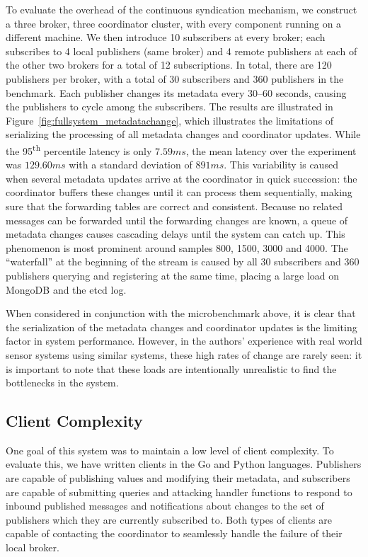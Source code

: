 To evaluate the overhead of the continuous syndication mechanism, we construct a three broker, three coordinator cluster, with every component running on a different machine.
We then introduce 10 subscribers at every broker; each subscribes to 4 local publishers (same broker) and 4 remote publishers at each of the other two brokers for a total of 12 subscriptions.
In total, there are 120 publishers per broker, with a total of 30 subscribers and 360 publishers in the benchmark.
Each publisher changes its metadata every 30--60 seconds, causing the publishers to cycle among the subscribers.
The results are illustrated in Figure~\ref{fig:fullsystem_metadatachange}, which illustrates the limitations of serializing the processing of all metadata changes and coordinator updates.
While the 95\textsuperscript{th} percentile latency is only $7.59ms$, the mean latency over the experiment was $129.60ms$ with a standard deviation of $891ms$.
This variability is caused when several metadata updates arrive at the coordinator in quick succession: the coordinator buffers these changes until it can process them sequentially, making sure that the forwarding tables are correct and consistent.
Because no related messages can be forwarded until the forwarding changes are known, a queue of metadata changes causes cascading delays until the system can catch up.
This phenomenon is most prominent around samples 800, 1500, 3000 and 4000.
The ``waterfall'' at the beginning of the stream is caused by all 30 subscribers and 360 publishers querying and registering at the same time, placing a large load on MongoDB and the etcd log.

When considered in conjunction with the microbenchmark above, it is clear that the serialization of the metadata changes and coordinator updates is the limiting factor in system performance.
However, in the authors' experience with real world sensor systems using similar systems, these high rates of change are rarely seen: it is important to note that these loads are intentionally unrealistic to find the bottlenecks in the system.

\subsection{Client Complexity}

One goal of this system was to maintain a low level of client complexity.
To evaluate this, we have written clients in the Go and Python languages.
Publishers are capable of publishing values and modifying their metadata, and subscribers are capable of submitting queries and attacking handler functions to respond to inbound published messages and notifications about changes to the set of publishers which they are currently subscribed to.
Both types of clients are capable of contacting the coordinator to seamlessly handle the failure of their local broker.

